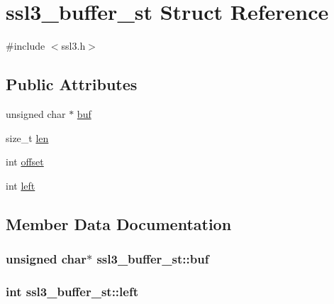 \hypertarget{structssl3__buffer__st}{}\section{ssl3\+\_\+buffer\+\_\+st Struct Reference}
\label{structssl3__buffer__st}


{\ttfamily \#include $<$ssl3.\+h$>$}

\subsection*{Public Attributes}
\begin{DoxyCompactItemize}
\item 
unsigned char $\ast$ \hyperlink{structssl3__buffer__st_a7b769263d556c41433a8cb932dadd8f7}{buf}
\item 
size\+\_\+t \hyperlink{structssl3__buffer__st_adfe7ca1f516b5502e927d8731608085b}{len}
\item 
int \hyperlink{structssl3__buffer__st_a9102947618e368b7454b8f3a32f8bf09}{offset}
\item 
int \hyperlink{structssl3__buffer__st_a5332410a4d9c20e73fd3dd36699436cb}{left}
\end{DoxyCompactItemize}


\subsection{Member Data Documentation}
\subsubsection[{\texorpdfstring{buf}{buf}}]{\setlength{\rightskip}{0pt plus 5cm}unsigned char$\ast$ ssl3\+\_\+buffer\+\_\+st\+::buf}\hypertarget{structssl3__buffer__st_a7b769263d556c41433a8cb932dadd8f7}{}\label{structssl3__buffer__st_a7b769263d556c41433a8cb932dadd8f7}
\subsubsection[{\texorpdfstring{left}{left}}]{\setlength{\rightskip}{0pt plus 5cm}int ssl3\+\_\+buffer\+\_\+st\+::left}\hypertarget{structssl3__buffer__st_a5332410a4d9c20e73fd3dd36699436cb}{}\label{structssl3__buffer__st_a5332410a4d9c20e73fd3dd36699436cb}
